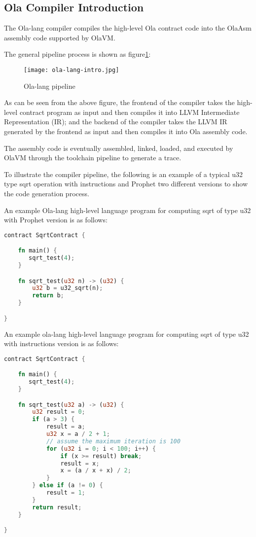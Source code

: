 \subsection{Ola Compiler Introduction}

The Ola-lang compiler compiles the high-level Ola contract code into the OlaAsm assembly code supported by OlaVM. 

The general pipeline process is shown as figure\ref{fig:ola-lang-intro}:

\begin{figure}[!htp]
    \centering
    \texttt{[image: ola-lang-intro.jpg]}
    \caption{Ola-lang pipeline}
    \label{fig:ola-lang-intro}
\end{figure}

As can be seen from the above figure, the frontend of the compiler takes the high-level contract program as input and then compiles it into LLVM Intermediate Representation (IR);
and the backend of the compiler takes the LLVM IR generated by the frontend as input and then compiles it into Ola assembly code.

The assembly code is eventually assembled, linked, loaded, and executed by OlaVM through the toolchain pipeline to generate a trace.

To illustrate the compiler pipeline, the following is an example of a typical u32 type sqrt operation with instructions and Prophet two different versions to show the code generation process.

An example Ola-lang high-level language program for computing sqrt of type u32 with Prophet version is as follows:
\begin{lstlisting}[language=rust]
contract SqrtContract {

    fn main() {
       sqrt_test(4);
    }

    fn sqrt_test(u32 n) -> (u32) {
        u32 b = u32_sqrt(n);
        return b;
    }

}
\end{lstlisting}


An example ola-lang high-level language program for computing sqrt of type u32 with instructions version is as follows:
\begin{lstlisting}[language=rust]
contract SqrtContract {

    fn main() {
       sqrt_test(4);
    }

    fn sqrt_test(u32 a) -> (u32) {
        u32 result = 0;
        if (a > 3) {
            result = a;
            u32 x = a / 2 + 1;
            // assume the maximum iteration is 100
            for (u32 i = 0; i < 100; i++) {
                if (x >= result) break;
                result = x;
                x = (a / x + x) / 2;
            }
        } else if (a != 0) {
            result = 1;
        }
        return result;
    }

}
\end{lstlisting}
